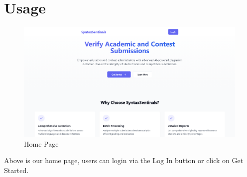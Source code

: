 \documentclass{article}
\begin{document}
\section{Usage}


\begin{figure}[H]
    \centering
    \includegraphics[width=\textwidth]{HomePage.png}
    \caption{Home Page}
    \label{fig:home}
  \end{figure}

Above is our home page, users can login via the Log In button or click on Get Started.
\end{document}
